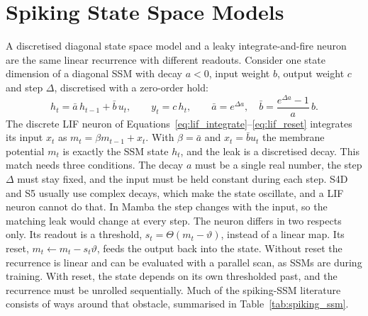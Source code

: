 \documentclass[11pt, a4paper]{report}
\begin{document}
\section{Spiking State Space Models}
\label{sec:spiking_ssm}
A discretised diagonal state space model and a leaky integrate-and-fire neuron are the same linear
recurrence with different readouts. Consider one state dimension of a diagonal SSM with decay $a<0$,
input weight $b$, output weight $c$ and step $\Delta$, discretised with a zero-order hold:
\begin{equation}
  h_t = \bar a\, h_{t-1} + \bar b\, u_t, \qquad y_t = c\, h_t, \qquad
  \bar a = e^{\Delta a}, \quad \bar b = \frac{e^{\Delta a}-1}{a}\, b .
  \label{eq:ssm_scalar}
\end{equation}
The discrete LIF neuron of Equations~\eqref{eq:lif_integrate}--\eqref{eq:lif_reset} integrates its input
$x_t$ as $m_t = \beta m_{t-1} + x_t$. With $\beta = \bar a$ and $x_t = \bar b u_t$ the membrane potential
$m_t$ is exactly the SSM state $h_t$, and the leak is a discretised decay. This match needs three conditions. The decay $a$ must be a single real number, the step $\Delta$ must stay fixed, and the input must be held constant during each step. S4D and S5 usually use complex decays, which make the state oscillate, and a LIF neuron cannot do
that. In Mamba the step changes with the input, so the matching leak would change at every step. The neuron differs in two
respects only. Its readout is a threshold, $s_t = \Theta(m_t - \vartheta)$, instead of a linear map. Its
reset, $m_t \leftarrow m_t - s_t\vartheta$, feeds the output back into the state. Without reset the recurrence is linear and can be evaluated with a parallel scan, as
SSMs are during training. With reset, the state depends on its own thresholded past, and the recurrence must
be unrolled sequentially. Much of the spiking-SSM literature consists of ways around that obstacle,
summarised in Table~\ref{tab:spiking_ssm}.
\end{document}
